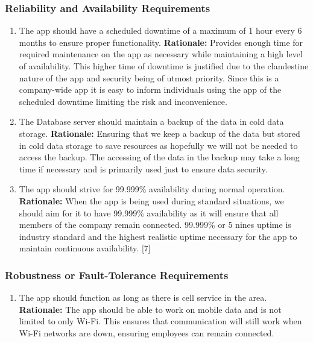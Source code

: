 \documentclass[]{article}
\begin{document}
\subsubsection{Reliability and Availability Requirements}
\label{ssub:reliability_and_availability_requirements}
\begin{enumerate}[{PR-RA}1. ]
	\item The app should have a scheduled downtime of a maximum of 1 hour every 6 months to ensure proper functionality. \newline
	      \textbf{Rationale:} Provides enough time for required maintenance on the app as necessary while maintaining a high level of availability. This higher time of downtime is justified due to the clandestine nature of the app and security being of utmost priority. Since this is a company-wide app it is easy to inform individuals using the app of the scheduled downtime limiting the risk and inconvenience.

	\item The Database server should maintain a backup of the data in cold data storage. \newline
	      \textbf{Rationale:} Ensuring that we keep a backup of the data but stored in cold data storage to save resources as hopefully we will not be needed to access the backup. The accessing of the data in the backup may take a long time if necessary and is primarily used just to ensure data security.

	\item The app should strive for 99.999\% availability during normal operation. \newline
	      \textbf{Rationale:} When the app is being used during standard situations, we should aim for it to have 99.999\% availability as it will ensure that all members of the company remain connected. 99.999\% or 5 nines uptime is industry standard and the highest realistic uptime necessary for the app to maintain continuous availability. [7]


\end{enumerate}

\subsubsection{Robustness or Fault-Tolerance Requirements}
\label{ssub:robustness_or_fault_tolerance_requirements}
\begin{enumerate}[{PR-RFT}1. ]
	\item The app should function as long as there is cell service in the area. \newline
	      \textbf{Rationale:} The app should be able to work on mobile data and is not limited to only Wi-Fi. This ensures that communication will still work when Wi-Fi networks are down, ensuring employees can remain connected.

\end{enumerate}
\end{document}
